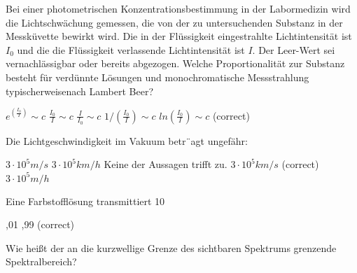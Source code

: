 \documentclass[11pt]{exam}
\begin{document}
\setlength{\voffset}{-0.5in}
\setlength{\headsep}{5pt}

\hspace{2mm}
 \hspace{5mm}
\vspace{4mm}

\begin{questions}

\question Bei einer photometrischen Konzentrationsbestimmung in der Labormedizin wird die Lichtschwächung gemessen, die von der zu untersuchenden Substanz in der Messküvette bewirkt wird. Die in der Flüssigkeit eingestrahlte Lichtintensität ist \( I_0 \) und die die Flüssigkeit verlassende Lichtintensität ist \(I\). Der Leer-Wert sei vernachlässigbar oder bereits abgezogen. Welche Proportionalität zur Substanz besteht für verdünnte Lösungen und monochromatische Messstrahlung typischerweisenach Lambert Beer?

\begin{choices}
	\choice \( e^{( \frac{I_0}{I})} \sim c \)
	\choice \( \frac{I_0}{I} \sim c \)
	\choice \( \frac{I}{I_0} \sim c \)
	\choice \( 1/( \frac{I_0}{I}) \sim c \)
	\choice \( ln ( \frac{I_0}{I}) \sim c \) (correct)
\end{choices}

\vspace{3mm}\question Die Lichtgeschwindigkeit im Vakuum betr¨agt ungefähr:

\begin{choices}
	\choice \( 3 \cdot10^5 m/s \)
	\choice \( 3 \cdot10^5 km/h \)
	\choice Keine der Aussagen trifft zu.
	\choice \( 3 \cdot10^5 km/s \) (correct)
	\choice \( 3 \cdot10^5 m/h \)
\end{choices}

\vspace{3mm}\question Eine Farbstofflösung transmittiert 10 %

\begin{choices}
	,01
	,99
	 (correct)
\end{choices}

\vspace{3mm}\question Wie heißt der an die kurzwellige Grenze des sichtbaren Spektrums grenzende Spektralbereich?


\end{questions}
\end{document}
